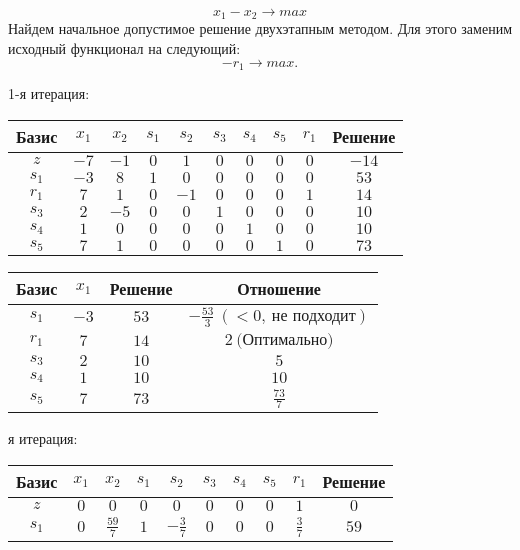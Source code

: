 \documentclass{article}%
\begin{document}
\[%
x_{1}-x_{2}  \to max%
\]%
Найдем начальное допустимое решение двухэтапным методом. Для этого заменим исходный функционал на следующий: %
\[%
-r_{1}\to max.%
\]%
\begin{flushleft}%
1{-}я итерация: %
\newline%
\newline%
\renewcommand{\arraystretch}{1.3}%
\begin{tabular}{|c|cccccccc|c|}%
\hline%
Базис&$x_{1}$&$x_{2}$&$s_{1}$&$s_{2}$&$s_{3}$&$s_{4}$&$s_{5}$&$r_{1}$&Решение\\%
\hline%
$z$&$-7$&$-1$&$0$&$1$&$0$&$0$&$0$&$0$&$-14$\\%
\hline%
$s_{1}$&$-3$&$8$&$1$&$0$&$0$&$0$&$0$&$0$&$53$\\%
$r_{1}$&$7$&$1$&$0$&$-1$&$0$&$0$&$0$&$1$&$14$\\%
$s_{3}$&$2$&$-5$&$0$&$0$&$1$&$0$&$0$&$0$&$10$\\%
$s_{4}$&$1$&$0$&$0$&$0$&$0$&$1$&$0$&$0$&$10$\\%
$s_{5}$&$7$&$1$&$0$&$0$&$0$&$0$&$1$&$0$&$73$\\%
\hline%
\end{tabular}%
\newline%
\newline%
\newline%
\begin{tabular}{|cccc|}%
\hline%
Базис&$x_{1}$&Решение&Отношение\\%
\hline%
$s_{1}$&$-3$&$53$&$-\frac{53}{3}\: (< 0, \: \text{не подходит})$\\%
$r_{1}$&$7$&$14$&$2\: \text{(Оптимально)}$\\%
$s_{3}$&$2$&$10$&$5$\\%
$s_{4}$&$1$&$10$&$10$\\%
$s_{5}$&$7$&$73$&$\frac{73}{7}$\\%
\hline%
\end{tabular}%
\newline%
\newline%
я итерация: %
\newline%
\newline%
\renewcommand{\arraystretch}{1.3}%
\begin{tabular}{|c|cccccccc|c|}%
\hline%
Базис&$x_{1}$&$x_{2}$&$s_{1}$&$s_{2}$&$s_{3}$&$s_{4}$&$s_{5}$&$r_{1}$&Решение\\%
\hline%
$z$&$0$&$0$&$0$&$0$&$0$&$0$&$0$&$1$&$0$\\%
\hline%
$s_{1}$&$0$&$\frac{59}{7}$&$1$&$-\frac{3}{7}$&$0$&$0$&$0$&$\frac{3}{7}$&$59$\\%

\end{tabular}
\end{flushleft}
\end{document}
